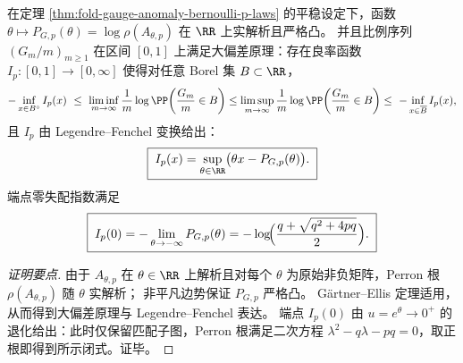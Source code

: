 \begin{proposition}\label{prop:fold-gauge-anomaly-bernoulli-p-ldp}
在定理 \ref{thm:fold-gauge-anomaly-bernoulli-p-laws} 的平稳设定下，函数 \(\theta\mapsto P_{G,p}(\theta)=\log\rho(A_{\theta,p})\) 在 \(\RR\) 上实解析且严格凸。
并且比例序列 \((G_m/m)_{m\ge 1}\) 在区间 \([0,1]\) 上满足大偏差原理：存在良率函数 \(I_p:[0,1]\to[0,\infty]\) 使得对任意 Borel 集 \(B\subset\RR\)，
\[
-\inf_{x\in B^\circ}I_p(x)\ \le\
\liminf_{m\to\infty}\frac1m\log\PP\!\left(\frac{G_m}{m}\in B\right)
\le
\limsup_{m\to\infty}\frac1m\log\PP\!\left(\frac{G_m}{m}\in B\right)
\le\
-\inf_{x\in \overline B}I_p(x),
\]
且 \(I_p\) 由 Legendre--Fenchel 变换给出：
\[
\boxed{\;
I_p(x)=\sup_{\theta\in\RR}\bigl(\theta x-P_{G,p}(\theta)\bigr). \;}
\]
端点零失配指数满足
\[
\boxed{\;
I_p(0)=-\lim_{\theta\to-\infty}P_{G,p}(\theta)
=-\log\!\Bigl(\frac{q+\sqrt{q^{2}+4pq}}{2}\Bigr). \;}
\]
\end{proposition}
\begin{proof}[证明要点]
由于 \(A_{\theta,p}\) 在 \(\theta\in\RR\) 上解析且对每个 \(\theta\) 为原始非负矩阵，Perron 根 \(\rho(A_{\theta,p})\) 随 \(\theta\) 实解析；
非平凡边势保证 \(P_{G,p}\) 严格凸。
G\"artner--Ellis 定理适用，从而得到大偏差原理与 Legendre--Fenchel 表达。
端点 \(I_p(0)\) 由 \(u=e^\theta\to 0^+\) 的退化给出：此时仅保留匹配子图，Perron 根满足二次方程 \(\lambda^2-q\lambda-pq=0\)，取正根即得到所示闭式。证毕。
\end{proof}

